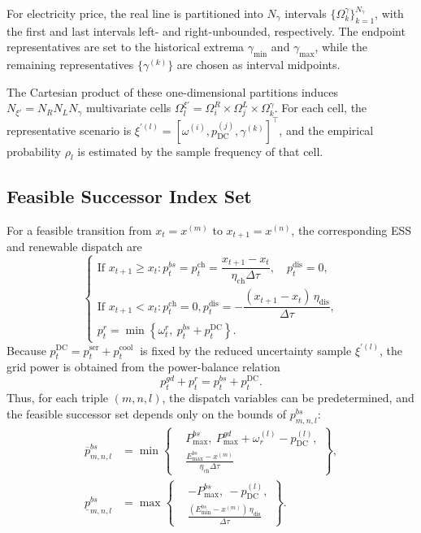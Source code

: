 \documentclass[a4paper,fleqn]{cas-dc}
\theoremstyle{plain}
\theoremstyle{remark}
\theoremstyle{plain}
\begin{document}
For electricity price, the real line is partitioned into $N_\gamma$ intervals
$\{\Omega_k^\gamma\}_{k=1}^{N_\gamma}$, with the first and last intervals left- and right-unbounded, respectively.
The endpoint representatives are set to the historical extrema $\gamma_{\min}$ and $\gamma_{\max}$, while the remaining
representatives $\{\gamma^{(k)}\}$ are chosen as interval midpoints.

The Cartesian product of these one-dimensional partitions induces
$N_{\xi'}=N_R N_L N_\gamma$ multivariate cells
$\Omega_l^{\xi'}=\Omega_i^R\times\Omega_j^L\times\Omega_k^\gamma$.
For each cell, the representative scenario is
$\xi^{\prime(l)}=[\omega^{(i)},p_{\text{DC}}^{(j)},\gamma^{(k)}]^\top$,
and the empirical probability $\rho_l$ is estimated by the sample frequency of that cell.

\subsection{Feasible Successor Index Set}\label{subsec:successor_set}
For a feasible transition from $x_t=x^{(m)}$ to $x_{t+1}=x^{(n)}$, the corresponding ESS and renewable dispatch are
\begin{equation}\label{ttmp1}
\left\{\begin{array}{l}
\text{If } x_{t+1}\ge x_t:
p_t^{{bs}} = p_t^{\text{ch}}=\dfrac{x_{t+1}-x_t}{\eta_{\text{ch}}\Delta\tau}, \quad p_t^{\text{dis}} = 0,\\[2mm]
\text{If } x_{t+1}< x_t:
p_t^{\text{ch}} = 0, p_t^{\text{dis}}=-\dfrac{(x_{t+1}-x_t)\,\eta_{\text{dis}}}{\Delta\tau},\\[2mm]
p_t^r=\min \left\{\omega_t^r,\ p_t^{bs}+p_t^{\text{DC}}\right\}.
\end{array}\right.
\end{equation}
Because $p_t^{\text{DC}}=p_t^{\text{ser}}+p_t^{\text{cool }}$ is fixed by the reduced uncertainty sample $\xi^{\prime(l)}$, the grid power is obtained from the power-balance relation
\begin{equation}\label{ttmp2}
p_t^{gd} + p_t^r=p_t^{bs}+p_t^{\text{DC}}.
\end{equation}
Thus, for each triple $(m,n,l)$, the dispatch variables can be predetermined, and the feasible successor set depends only on the bounds of $p_{m,n,l}^{bs}$:
\begin{align*}
\overline{p}^{bs}_{m,n,l}
&= \min\!\left\{\begin{aligned}&P_{\max}^{bs},\ P_{\max}^{gd}+\omega_r^{(l)}-p^{(l)}_{\text{DC}},\\&\frac{E_{\max}^{bs}-x^{(m)}}{\eta_{\text{ch}}\Delta\tau}\end{aligned}\right\},\\
\underline{p}^{bs}_{m,n,l}
&= \max\!\left\{\begin{aligned}&-P_{\max}^{bs},\ -p^{(l)}_{\text{DC}},\\&\frac{(E_{\min}^{bs}-x^{(m)})\,\eta_{\text{dis}}}{\Delta\tau}\end{aligned}\right\}.
\end{align*}
\end{document}
